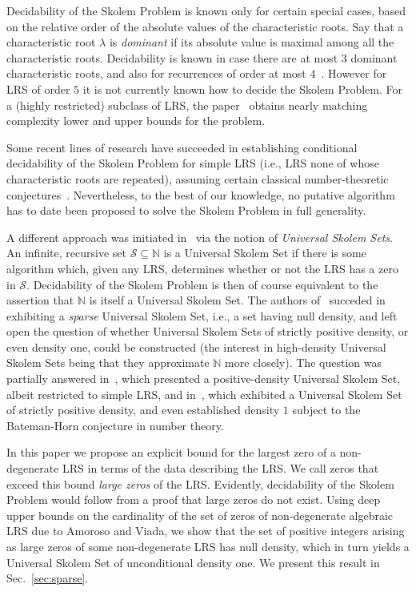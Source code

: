 \documentclass[preprint,12pt]{elsarticle}
\begin{document}
Decidability of the Skolem Problem is known only for certain special
cases, based on the relative order of the absolute values of the
characteristic roots.  Say that a characteristic root $\lambda$ is
\emph{dominant} if its absolute value is maximal among all the
characteristic roots.  Decidability is known in case there are at most
$3$ dominant characteristic roots, and also for recurrences of order
at most $4$~\cite{MST84,Ver85}.  However for LRS of order $5$ it is
not currently known how to decide the Skolem Problem.  For a (highly
restricted) subclass of LRS, the paper~\cite{AkshayBMV020} obtains
nearly matching complexity lower and upper bounds for the problem.

Some recent lines of research have succeeded in establishing
conditional decidability of the Skolem Problem for simple LRS (i.e.,
LRS none of whose characteristic roots are repeated), assuming certain
classical number-theoretic
conjectures~\cite{LLNOP022,BLNOPW22}. Nevertheless, to the best of our
knowledge, no putative algorithm has to date been proposed to solve
the Skolem Problem in full generality.

A different approach was initiated in~\cite{LOW21,LOW22,LMNOW} via the
notion of \emph{Universal Skolem Sets}. An infinite, recursive set
$\mathcal{S} \subseteq \mathbb{N}$ is a Universal Skolem Set if there
is some algorithm which, given any LRS, determines whether or not the
LRS has a zero in $\mathcal{S}$. Decidability of the Skolem Problem is
then of course equivalent to the assertion that $\mathbb{N}$ is itself
a Universal Skolem Set. The authors of~\cite{LOW21} succeded in
exhibiting a \emph{sparse} Universal Skolem Set, i.e., a set having
null density, and left open the question of whether Universal Skolem
Sets of strictly positive density, or even density one, could be
constructed (the interest in high-density Universal Skolem Sets being that they approximate
$\mathbb{N}$ more closely). The question was partially answered
in~\cite{LOW22}, which presented a positive-density Universal Skolem Set,
albeit restricted to simple LRS, and in~\cite{LMNOW}, which exhibited a
Universal Skolem Set of strictly positive density, and even
established density $1$ subject to the Bateman-Horn conjecture in
number theory.

In this paper we propose an explicit bound for the largest zero of a
non-degenerate LRS in terms of the data describing the LRS\@.  We call
zeros that exceed this bound \emph{large zeros} of the LRS\@.
Evidently, decidability of the Skolem Problem would follow from a
proof that large zeros do not exist.  Using deep upper bounds on the
cardinality of the set of zeros of non-degenerate algebraic LRS due to Amoroso
and Viada, we show that the set of positive integers arising as
large zeros of some non-degenerate LRS has null density, which in turn
yields a Universal Skolem Set of unconditional density one. We present
this result in Sec.~\ref{sec:sparse}.
\end{document}
